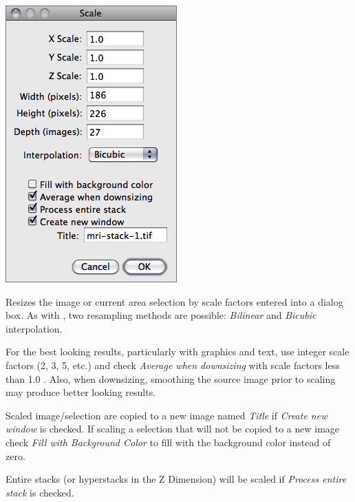 \begin{minipage}[c][1\totalheight][t]{0.36\columnwidth}%
\includegraphics[scale=0.55]{images/Scale}%
\end{minipage}%
\begin{minipage}[c][1\totalheight][t]{0.64\columnwidth}%
Resizes the image or current area selection by scale factors entered
into a dialog box. As with ,
two resampling methods are possible: \emph{Bilinear} and \emph{Bicubic}
interpolation. \medskip{}


For the best looking results, particularly with graphics and text,
use integer scale factors (2, 3, 5, etc.) and check \emph{Average
when downsizing} with scale factors less than 1.0 \cite{C-Resizer-Scaler}.
Also, when downsizing, smoothing the source image prior to scaling
may produce better looking results. \medskip{}


Scaled image/selection are copied to a new image named \emph{Title}
if \emph{Create new window} is checked. If scaling a selection that
will not be copied to a new image check \emph{Fill with Background
Color} to fill with the background color instead of zero.\medskip{}


Entire stacks (or hyperstacks in the Z Dimension) will be scaled if
\emph{Process entire stack} is checked.%
\end{minipage}




